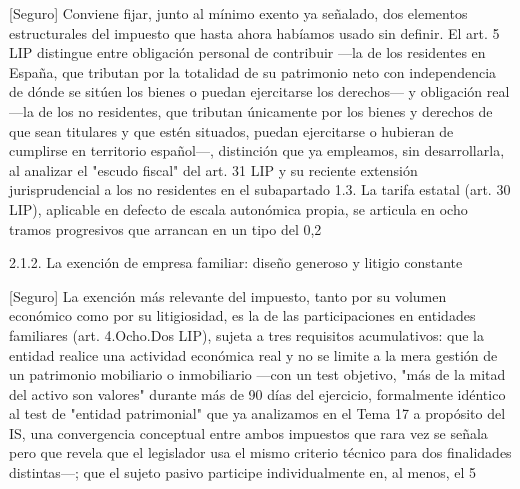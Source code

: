 \documentclass[10pt,a4paper]{article}
\begin{document}
[Seguro] Conviene fijar, junto al mínimo exento ya señalado, dos elementos estructurales del impuesto que hasta ahora habíamos usado sin definir. El art. 5 LIP distingue entre obligación personal de contribuir —la de los residentes en España, que tributan por la totalidad de su patrimonio neto con independencia de dónde se sitúen los bienes o puedan ejercitarse los derechos— y obligación real —la de los no residentes, que tributan únicamente por los bienes y derechos de que sean titulares y que estén situados, puedan ejercitarse o hubieran de cumplirse en territorio español—, distinción que ya empleamos, sin desarrollarla, al analizar el "escudo fiscal" del art. 31 LIP y su reciente extensión jurisprudencial a los no residentes en el subapartado 1.3. La tarifa estatal (art. 30 LIP), aplicable en defecto de escala autonómica propia, se articula en ocho tramos progresivos que arrancan en un tipo del 0,2%

2.1.2. La exención de empresa familiar: diseño generoso y litigio constante

[Seguro] La exención más relevante del impuesto, tanto por su volumen económico como por su litigiosidad, es la de las participaciones en entidades familiares (art. 4.Ocho.Dos LIP), sujeta a tres requisitos acumulativos: que la entidad realice una actividad económica real y no se limite a la mera gestión de un patrimonio mobiliario o inmobiliario —con un test objetivo, "más de la mitad del activo son valores" durante más de 90 días del ejercicio, formalmente idéntico al test de "entidad patrimonial" que ya analizamos en el Tema 17 a propósito del IS, una convergencia conceptual entre ambos impuestos que rara vez se señala pero que revela que el legislador usa el mismo criterio técnico para dos finalidades distintas—; que el sujeto pasivo participe individualmente en, al menos, el 5%
\end{document}
